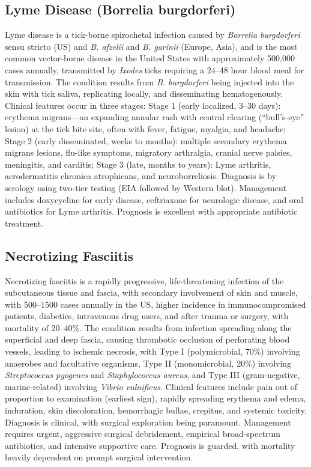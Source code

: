 \subsection{Lyme Disease (Borrelia burgdorferi)}
\label{sec:Lyme Disease}
Lyme disease is a tick-borne spirochetal infection caused by \textit{Borrelia burgdorferi} sensu stricto (US) and \textit{B. afzelii} and \textit{B. garinii} (Europe, Asia), and is the most common vector-borne disease in the United States with approximately 500,000 cases annually, transmitted by \textit{Ixodes} ticks requiring a 24--48 hour blood meal for transmission. The condition results from \textit{B. burgdorferi} being injected into the skin with tick saliva, replicating locally, and disseminating hematogenously. Clinical features occur in three stages: Stage 1 (early localized, 3--30 days): erythema migrans---an expanding annular rash with central clearing (``bull's-eye'' lesion) at the tick bite site, often with fever, fatigue, myalgia, and headache; Stage 2 (early disseminated, weeks to months): multiple secondary erythema migrans lesions, flu-like symptoms, migratory arthralgia, cranial nerve palsies, meningitis, and carditis; Stage 3 (late, months to years): Lyme arthritis, acrodermatitis chronica atrophicans, and neuroborreliosis. Diagnosis is by serology using two-tier testing (EIA followed by Western blot). Management includes doxycycline for early disease, ceftriaxone for neurologic disease, and oral antibiotics for Lyme arthritis. Prognosis is excellent with appropriate antibiotic treatment.

\subsection{Necrotizing Fasciitis}
\label{sec:Necrotizing Fasciitis}
Necrotizing fasciitis is a rapidly progressive, life-threatening infection of the subcutaneous tissue and fascia, with secondary involvement of skin and muscle, with 500--1500 cases annually in the US, higher incidence in immunocompromised patients, diabetics, intravenous drug users, and after trauma or surgery, with mortality of 20--40\%. The condition results from infection spreading along the superficial and deep fascia, causing thrombotic occlusion of perforating blood vessels, leading to ischemic necrosis, with Type I (polymicrobial, 70\%) involving anaerobes and facultative organisms, Type II (monomicrobial, 20\%) involving \textit{Streptococcus pyogenes} and \textit{Staphylococcus aureus}, and Type III (gram-negative, marine-related) involving \textit{Vibrio vulnificus}. Clinical features include pain out of proportion to examination (earliest sign), rapidly spreading erythema and edema, induration, skin discoloration, hemorrhagic bullae, crepitus, and systemic toxicity. Diagnosis is clinical, with surgical exploration being paramount. Management requires urgent, aggressive surgical debridement, empirical broad-spectrum antibiotics, and intensive supportive care. Prognosis is guarded, with mortality heavily dependent on prompt surgical intervention.

